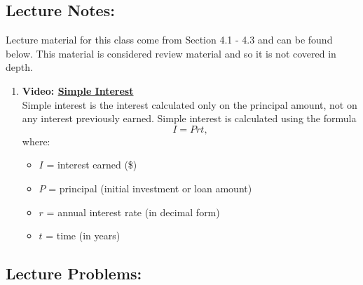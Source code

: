 \documentclass[
]{book}
\providecommand{\tightlist}{%
  \setlength{\itemsep}{0pt}\setlength{\parskip}{0pt}}
\begin{document}
\subsection*{Lecture Notes:}\label{lecture-notes-6}

Lecture material for this class come from Section 4.1 - 4.3 and can be found below. This material is considered review material and so it is not covered in depth.

\begin{enumerate}
\def\labelenumi{\arabic{enumi}.}
\tightlist
\item
  \textbf{Video: \href{https://youtu.be/zxGUXpDlWgg}{Simple Interest}}\\
  Simple interest is the interest calculated only on the principal amount, not on any interest previously earned. Simple interest is calculated using the formula \[I = Prt,\] where:

  \begin{itemize}
  \tightlist
  \item
    \(I\) = interest earned (\$)
  \item
    \(P\) = principal (initial investment or loan amount)
  \item
    \(r\) = annual interest rate (in decimal form)
  \item
    \(t\) = time (in years)
  \end{itemize}
\end{enumerate}

\subsection*{Lecture Problems:}\label{lecture-problems-6}
\end{document}
